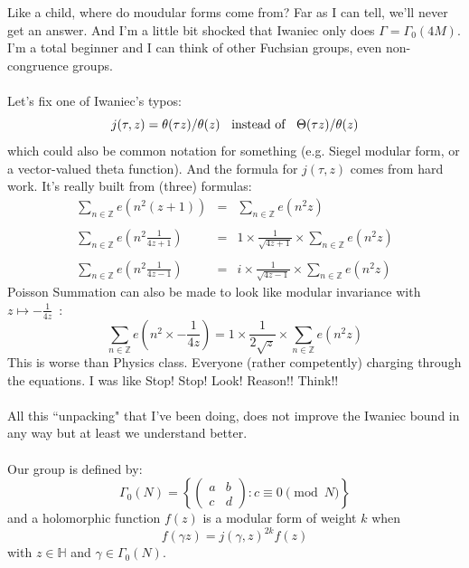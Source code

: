 \documentclass[12pt]{article}
\begin{document}
\noindent Like a child, where do moudular forms come from? Far as I can tell, we'll never get an answer.  And I'm a little bit shocked that Iwaniec only does $\Gamma = \Gamma_0(4M)$.  I'm a total beginner and I can think of other Fuchsian groups, even non-congruence groups.  \\ \\ 
Let's fix one of Iwaniec's typos:
$$ j(\tau, z) = \theta(\tau z) / \theta(z) \hspace{0.125in}\text{instead of}\hspace{0.125in}
\Theta(\tau z) / \theta(z) $$
which could also be common notation for something (e.g. Siegel modular form, or a vector-valued theta function).  And the formula for $j(\tau, z)$ comes from hard work.  It's really built from (three) formulas:
\begin{eqnarray*}
\sum_{n \in \mathbb{Z}} e(n^2 (z+1) ) &=& \sum_{n \in \mathbb{Z}} e(n^2 z ) \\ \\
\sum_{n \in \mathbb{Z}} e(n^2 \frac{1}{4z+1} ) &=& 1 \times \frac{1}{\sqrt{4z+1}} \times \sum_{n \in \mathbb{Z}} e(n^2 z ) \\ \\
\sum_{n \in \mathbb{Z}} e(n^2 \frac{1}{4z-1} ) &=& i \times \frac{1}{\sqrt{4z-1}} \times \sum_{n \in \mathbb{Z}} e(n^2 z )
\end{eqnarray*}
Poisson Summation can also be made to look like modular invariance with $z \mapsto - \frac{1}{4z} $ \,:
$$ \sum_{n \in \mathbb{Z}} e(n^2 \times - \frac{1}{4z} ) = 1 \times \frac{1}{2\sqrt{z}} \times \sum_{n \in \mathbb{Z}} e(n^2 z ) $$ 
This is worse than Physics class.  Everyone (rather competently) charging through the equations.  I was like Stop! Stop! Look! Reason!! Think!! \\ \\
All this ``unpacking" that I've been doing, does not improve the Iwaniec bound in any way but at least we understand better. \\ \\
Our group is defined by:
$$ \Gamma_0(N) = \left\{  \left( \begin{array}{cc} a & b \\ c & d \end{array}\right) 
: c \equiv 0 \pmod N\right\} $$
and a holomorphic function $f(z)$ is a modular form of weight $k$ when
$$ f( \gamma z) = j(\gamma, z)^{2k}f(z)$$
with $z \in \mathbb{H} $ and $\gamma \in \Gamma_0(N)$. \\ \\
\end{document}
